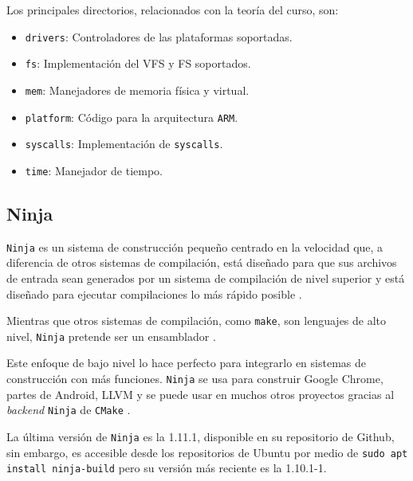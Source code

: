 Los principales directorios, relacionados con la teoría del curso, son:
\begin{itemize} \setlength\itemsep{0pt}
	\item \texttt{drivers}: Controladores de las plataformas soportadas.
	\item \texttt{fs}: Implementación del VFS y FS soportados.
	\item \texttt{mem}: Manejadores de memoria física y virtual.
	\item \texttt{platform}: Código para la arquitectura \texttt{ARM}.
	\item \texttt{syscalls}: Implementación de \texttt{syscalls}.
	\item \texttt{time}: Manejador de tiempo.
\end{itemize}



\newpage
\subsection{Ninja \label{ssec:ninja}}
	\texttt{Ninja} es un sistema de construcción pequeño centrado en la velocidad que, a diferencia de otros sistemas de compilación, está diseñado para que sus archivos de entrada sean generados por un sistema de compilación de nivel superior y está diseñado para ejecutar compilaciones lo más rápido posible \cite{ninja}.
	
	Mientras que otros sistemas de compilación, como \texttt{make}, son lenguajes de alto nivel, \texttt{Ninja} pretende ser un ensamblador \cite{ninja}. 
	
	Este enfoque de bajo nivel lo hace perfecto para integrarlo en sistemas de construcción con más funciones. \texttt{Ninja} se usa para construir Google Chrome, partes de Android, LLVM y se puede usar en muchos otros proyectos gracias al \textit{backend} \texttt{Ninja} de \texttt{CMake} \cite{ninja}.
	
	La última versión de \texttt{Ninja} es la 1.11.1, disponible en su repositorio de Github, sin embargo, es accesible desde los repositorios de Ubuntu por medio de \texttt{sudo apt install ninja-build} pero su versión más reciente es la 1.10.1-1.
	
